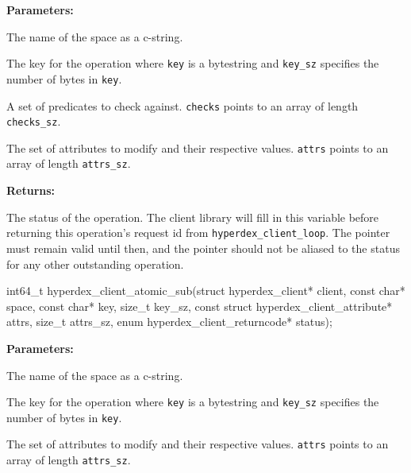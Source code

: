 \noindent\textbf{Parameters:}
\begin{description}[labelindent=\widthof{{\texttt{checks}, \texttt{checks\_sz}}},leftmargin=*,noitemsep,nolistsep,align=right]
\item[\texttt{space}] The name of the space as a c-string.
\item[\texttt{key}, \texttt{key\_sz}] The key for the operation where \texttt{key} is a bytestring and \texttt{key\_sz} specifies the number of bytes in \texttt{key}.
\item[\texttt{checks}, \texttt{checks\_sz}] A set of predicates to check against.  \texttt{checks} points to an array of length \texttt{checks\_sz}.
\item[\texttt{attrs}, \texttt{attrs\_sz}] The set of attributes to modify and their respective values.  \texttt{attrs} points to an array of length \texttt{attrs\_sz}.
\end{description}

\noindent\textbf{Returns:}
\begin{description}[labelindent=\widthof{{\texttt{status}}},leftmargin=*,noitemsep,nolistsep,align=right]
\item[\texttt{status}] The status of the operation.  The client library will fill in this variable before returning this operation's request id from \texttt{hyperdex\_client\_loop}.  The pointer must remain valid until then, and the pointer should not be aliased to the status for any other outstanding operation.
\end{description}

\funcsep
{}
\begin{ccode}
int64_t hyperdex_client_atomic_sub(struct hyperdex_client* client,
                const char* space,
                const char* key, size_t key_sz,
                const struct hyperdex_client_attribute* attrs, size_t attrs_sz,
                enum hyperdex_client_returncode* status);
\end{ccode}
\funcdesc 

\noindent\textbf{Parameters:}
\begin{description}[labelindent=\widthof{{\texttt{attrs}, \texttt{attrs\_sz}}},leftmargin=*,noitemsep,nolistsep,align=right]
\item[\texttt{space}] The name of the space as a c-string.
\item[\texttt{key}, \texttt{key\_sz}] The key for the operation where \texttt{key} is a bytestring and \texttt{key\_sz} specifies the number of bytes in \texttt{key}.
\item[\texttt{attrs}, \texttt{attrs\_sz}] The set of attributes to modify and their respective values.  \texttt{attrs} points to an array of length \texttt{attrs\_sz}.
\end{description}

